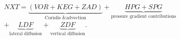 \begin{equation}
\begin{split}
    NXT = \underbrace{(VOR+KEG+ZAD)}_\text{Coriolis \& advection} + \underbrace{HPG+SPG}_\text{pressure gradient contributions} \\
    +\underbrace{LDF}_\text{lateral diffusion} +\underbrace{ZDF}_\text{vertical diffusion}.
\end{split}
\label{EQN:NEMOPrognostic}
\end{equation}
